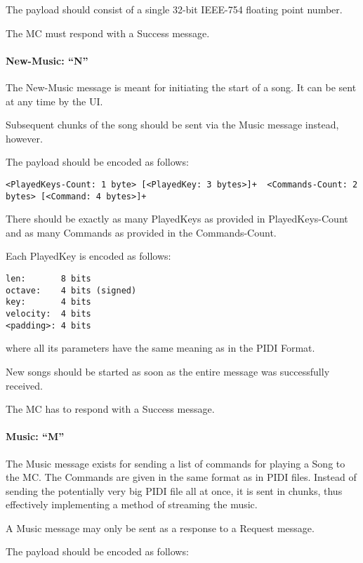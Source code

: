 The payload should consist of a single 32-bit IEEE-754 floating point number.

The MC must respond with a Success message.

\paragraph{New-Music: \enquote{N}}

The New-Music message is meant for initiating the start of a song. It can be sent at any time by the UI.

Subsequent chunks of the song should be sent via the Music message instead, however.

The payload should be encoded as follows:

\begin{verbatim}
<PlayedKeys-Count: 1 byte> [<PlayedKey: 3 bytes>]+  <Commands-Count: 2 bytes> [<Command: 4 bytes>]+
\end{verbatim}

There should be exactly as many PlayedKeys as provided in PlayedKeys-Count and as many Commands as provided in the Commands-Count.

Each PlayedKey is encoded as follows:

\begin{verbatim}
len:       8 bits
octave:    4 bits (signed)
key:       4 bits
velocity:  4 bits
<padding>: 4 bits
\end{verbatim}

where all its parameters have the same meaning as in the PIDI Format.

New songs should be started as soon as the entire message was successfully received.

The MC has to respond with a Success message.

\paragraph{Music: \enquote{M}}

The Music message exists for sending a list of commands for playing a Song to the MC. The Commands are given in the same format as in PIDI files. Instead of sending the potentially very big PIDI file all at once, it is sent in chunks, thus effectively implementing a method of streaming the music.

A Music message may only be sent as a response to a Request message.

The payload should be encoded as follows:


